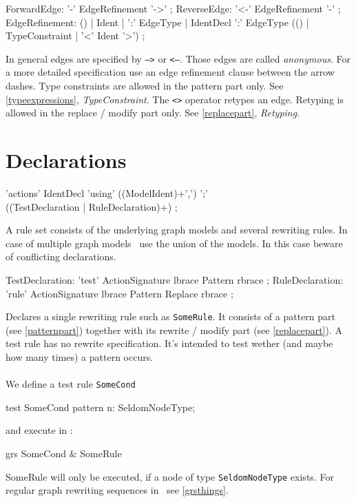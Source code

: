 \begin{rail}
  ForwardEdge: '-' EdgeRefinement '->' ;
  ReverseEdge: '<-' EdgeRefinement '-' ;  
  EdgeRefinement: () | Ident | ':' EdgeType | IdentDecl ':' EdgeType (() | TypeConstraint | '<' Ident '>') ;
\end{rail}
In general edges are specified by \texttt{-->} or \texttt{<--}. Those edges are called \emph{anonymous}. For a more detailed specification use an edge refinement clause between the arrow dashes. Type constraints are allowed in the pattern part only. See \ref{typeexpressions}, \emph{TypeConstraint}. The \texttt{<>} operator retypes an edge. Retyping is allowed in the replace / modify part only. See \ref{replacepart}, \emph{Retyping}.

\section{Declarations}
\label{ruledecls}
\begin{rail}
  'actions' IdentDecl 'using' ((ModelIdent)+',') ';' \\ ((TestDeclaration | RuleDeclaration)+) ;
\end{rail}
A rule set consists of the underlying graph models and several rewriting rules. In case of multiple graph models \GrG\ use the union of the models. In this case beware of conflicting declarations.

\begin{rail}
  TestDeclaration: 'test' ActionSignature lbrace Pattern rbrace ;
  RuleDeclaration: 'rule' ActionSignature lbrace Pattern Replace rbrace ;
\end{rail}
Declares a single rewriting rule such as \texttt{SomeRule}. It consists of a pattern part (see \ref{patternpart}) together with its rewrite / modify part (see \ref{replacepart}). A test rule has no rewrite specification. It's intended to test wether (and maybe how many times) a pattern occurs.\\
{\small \\We define a test rule \texttt{SomeCond}}
\begin{grgen}
test SomeCond {
  pattern {
    n: SeldomNodeType;
  }
}
\end{grgen}
{\small and execute in \GrShell:}
\begin{grshell}
  grs SomeCond & SomeRule
\end{grshell}
{\small SomeRule will only be executed, if a node of type \texttt{SeldomNodeType} exists. For regular graph rewriting sequences in \GrShell\ see \ref{grsthings}.\\}

